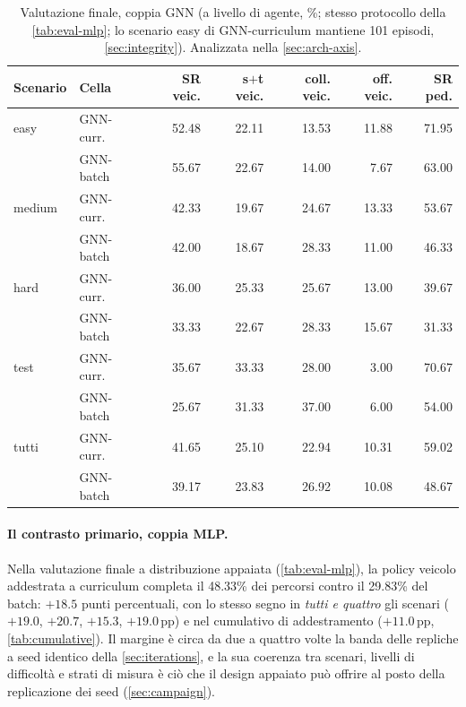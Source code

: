 \begin{table}[t]
  \centering\small
  \caption{Valutazione finale, coppia GNN (a livello di agente, \%;
  stesso protocollo della \cref{tab:eval-mlp}; lo scenario easy di
  GNN-curriculum mantiene 101 episodi, \cref{sec:integrity}). Analizzata
  nella \cref{sec:arch-axis}.}
  \label{tab:eval-gnn}
  \begin{tabular}{@{}llrrrrr@{}}
    \toprule
    Scenario & Cella & SR veic. & s$+$t veic. & coll. veic. & off. veic. & SR ped. \\
    \midrule
    easy   & GNN-curr.\ & 52.48 & 22.11 & 13.53 & 11.88 & 71.95 \\
           & GNN-batch  & 55.67 & 22.67 & 14.00 & 7.67 & 63.00 \\
    medium & GNN-curr.\ & 42.33 & 19.67 & 24.67 & 13.33 & 53.67 \\
           & GNN-batch  & 42.00 & 18.67 & 28.33 & 11.00 & 46.33 \\
    hard   & GNN-curr.\ & 36.00 & 25.33 & 25.67 & 13.00 & 39.67 \\
           & GNN-batch  & 33.33 & 22.67 & 28.33 & 15.67 & 31.33 \\
    test   & GNN-curr.\ & 35.67 & 33.33 & 28.00 & 3.00 & 70.67 \\
           & GNN-batch  & 25.67 & 31.33 & 37.00 & 6.00 & 54.00 \\
    \midrule
    tutti  & GNN-curr.\ & 41.65 & 25.10 & 22.94 & 10.31 & 59.02 \\
           & GNN-batch  & 39.17 & 23.83 & 26.92 & 10.08 & 48.67 \\
    \bottomrule
  \end{tabular}
\end{table}

\paragraph{Il contrasto primario, coppia MLP.}
Nella valutazione finale a distribuzione appaiata
(\cref{tab:eval-mlp}), la policy veicolo addestrata a curriculum
completa il 48.33\% dei percorsi contro il 29.83\% del batch: $+18.5$
punti percentuali, con lo stesso segno in \emph{tutti e quattro} gli
scenari ($+19.0$, $+20.7$, $+15.3$, $+19.0$\,pp) e nel cumulativo di
addestramento ($+11.0$\,pp, \cref{tab:cumulative}). Il margine è circa
da due a quattro volte la banda delle repliche a seed identico della
\cref{sec:iterations}, e la sua coerenza tra scenari, livelli di
difficoltà e strati di misura è ciò che il design appaiato può offrire
al posto della replicazione dei seed (\cref{sec:campaign}).


